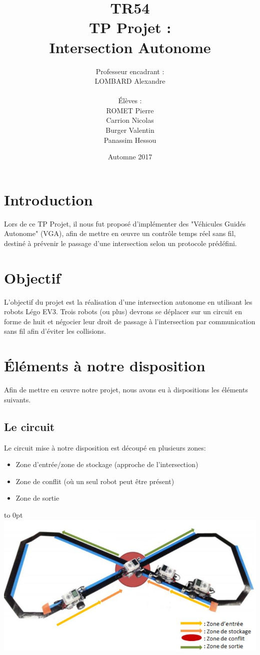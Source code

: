 \documentclass[french,a4paper,12pt]{report}
\title{TR54 \\ TP Projet :\\ Intersection Autonome}
\author{Professeur encadrant :\\LOMBARD Alexandre \\\\ Élèves :\\ROMET Pierre\\Carrion Nicolas\\Burger Valentin\\Panassim Hessou}
\date{Automne 2017}
\begin{document}
\maketitle

\tableofcontents

\part{Introduction}
Lors de ce TP Projet,
il nous fut proposé d'implémenter des "Véhicules Guidés Autonome" (VGA), afin de mettre en œuvre un contrôle
temps réel sans fil, destiné à prévenir le passage d'une intersection selon un protocole prédéfini.

\part{Objectif}
L'objectif du projet est la réalisation d'une intersection autonome en utilisant les robots Légo EV3.
Trois robots (ou plus) devrons se déplacer sur un circuit en forme de huit et négocier leur droit de passage à
l'intersection par communication sans fil afin d'éviter les collisions.

\part{Éléments à notre disposition}
Afin de mettre en œuvre notre projet, nous avons eu à dispositions les éléments suivants.

\chapter{Le circuit}
Le circuit mise à notre disposition est découpé en plusieurs zones:
\begin{itemize}
\item Zone d’entrée/zone de stockage (approche de l’intersection)
\item Zone de conflit (où un seul robot peut être présent)
\item Zone de sortie
\end{itemize}

\hfill\hbox to 0pt{\hss\includegraphics[width=15cm]{circuit.png}\hss}\hfill\null\newline
\end{document}
